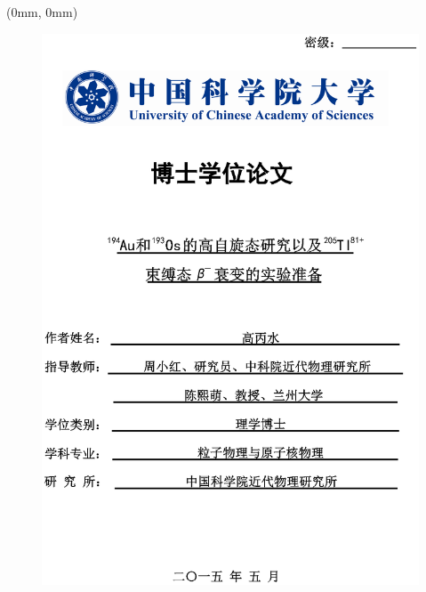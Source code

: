 \begin{textblock*}{210mm}(0mm, 0mm)
\begin{figure}[!hbt]
	\centering
	\includegraphics[width=210mm]{fig/cover_cn.eps}
\end{figure}
\end{textblock*}
